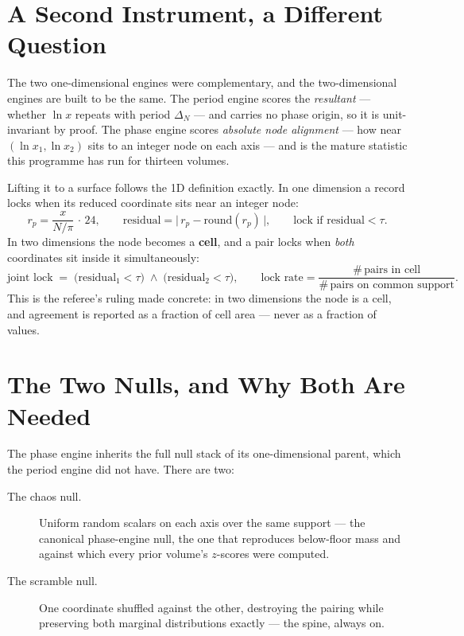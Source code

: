 \documentclass[11pt, letterpaper, openany]{book}
\begin{document}
\section{A Second Instrument, a Different Question}

The two one-dimensional engines were complementary, and the two-dimensional engines are built to be
the same. The period engine scores the \emph{resultant} --- whether $\ln x$ repeats with period
$\Delta_N$ --- and carries no phase origin, so it is unit-invariant by proof. The phase engine
scores \emph{absolute node alignment} --- how near $(\ln x_1, \ln x_2)$ sits to an integer node on
each axis --- and is the mature statistic this programme has run for thirteen volumes.

Lifting it to a surface follows the 1D definition exactly. In one dimension a record locks when its
reduced coordinate sits near an integer node:
\[
r_p = \frac{x}{N/\pi}\,\cdot\,24, \qquad \text{residual} = \big|\,r_p - \mathrm{round}(r_p)\,\big|,
\qquad \text{lock if residual} < \tau .
\]
In two dimensions the node becomes a \textbf{cell}, and a pair locks when \emph{both} coordinates
sit inside it simultaneously:
\[
\text{joint lock} \;=\; \big(\text{residual}_1 < \tau\big) \;\wedge\; \big(\text{residual}_2 < \tau\big),
\qquad
\text{lock rate} = \frac{\#\,\text{pairs in cell}}{\#\,\text{pairs on common support}} .
\]
This is the referee's ruling made concrete: in two dimensions the node is a cell, and agreement is
reported as a fraction of cell area --- never as a fraction of values.

\section{The Two Nulls, and Why Both Are Needed}

The phase engine inherits the full null stack of its one-dimensional parent, which the period engine
did not have. There are two:

\begin{description}
\item[The chaos null.] Uniform random scalars on each axis over the same support --- the canonical
phase-engine null, the one that reproduces below-floor mass and against which every prior volume's
$z$-scores were computed.
\item[The scramble null.] One coordinate shuffled against the other, destroying the pairing while
preserving both marginal distributions exactly --- the spine, always on.
\end{description}
\end{document}
